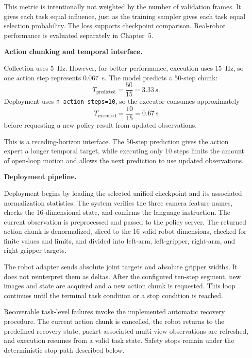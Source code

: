 This metric is intentionally not weighted by the number of validation frames. It gives each task equal influence, just as the training sampler gives each task equal selection probability. The loss supports checkpoint comparison. Real-robot performance is evaluated separately in Chapter~5.

\medskip
\noindent\textbf{Action chunking and temporal interface.}

Collection uses 5~Hz. However, for better performance, execution uses 15~Hz, so one action step represents 0.067~s. The model predicts a 50-step chunk:
\begin{equation}
T_{\mathrm{predicted}}=\frac{50}{15}=3.33~\mathrm{s}.
\end{equation}
Deployment uses \texttt{n\_action\_steps=10}, so the executor consumes approximately
\begin{equation}
T_{\mathrm{executed}}=\frac{10}{15}=0.67~\mathrm{s}
\end{equation}
before requesting a new policy result from updated observations.

This is a receding-horizon interface. The 50-step prediction gives the action expert a longer temporal target, while executing only 10 steps limits the amount of open-loop motion and allows the next prediction to use updated observations.

\medskip
\noindent\textbf{Deployment pipeline.}

Deployment begins by loading the selected unified checkpoint and its associated normalization statistics. The system verifies the three camera feature names, checks the 16-dimensional state, and confirms the language instruction. The current observation is preprocessed and passed to the policy server. The returned action chunk is denormalized, sliced to the 16 valid robot dimensions, checked for finite values and limits, and divided into left-arm, left-gripper, right-arm, and right-gripper targets.

The robot adapter sends absolute joint targets and absolute gripper widths. It does not reinterpret them as deltas. After the configured ten-step segment, new images and state are acquired and a new action chunk is requested. This loop continues until the terminal task condition or a stop condition is reached.

Recoverable task-level failures invoke the implemented automatic recovery
procedure. The current action chunk is cancelled, the robot returns to the
predefined recovery state, packet-associated multi-view observations are
refreshed, and execution resumes from a valid task state. Safety stops remain
under the deterministic stop path described below.

